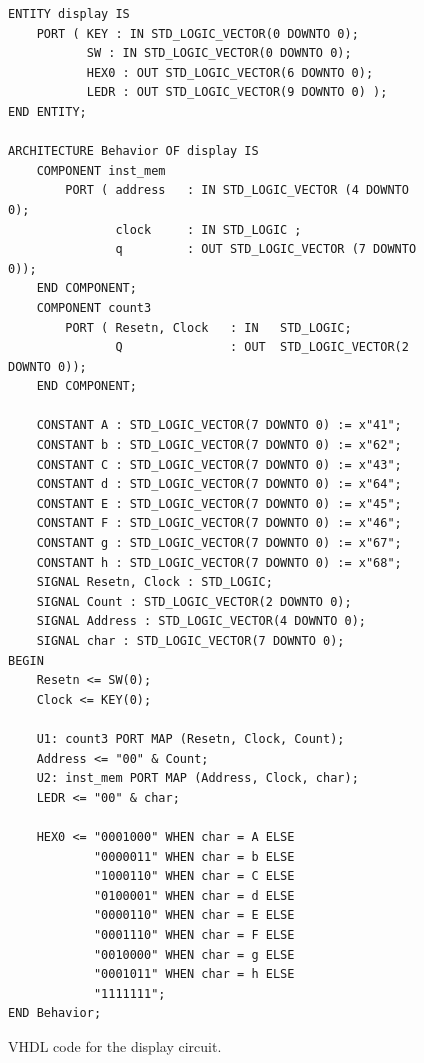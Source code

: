 \documentclass[11pt, twoside, pdftex]{article}
\begin{document}
\lstset{language=VHDL,numbers=none,escapechar=?}
\begin{figure}[h!]
\begin{center}
\begin{minipage}[t]{15 cm}
\begin{lstlisting}[name=display]
ENTITY display IS
    PORT ( KEY : IN STD_LOGIC_VECTOR(0 DOWNTO 0);
           SW : IN STD_LOGIC_VECTOR(0 DOWNTO 0);  
           HEX0 : OUT STD_LOGIC_VECTOR(6 DOWNTO 0);
           LEDR : OUT STD_LOGIC_VECTOR(9 DOWNTO 0) );
END ENTITY; 

ARCHITECTURE Behavior OF display IS
    COMPONENT inst_mem 
        PORT ( address   : IN STD_LOGIC_VECTOR (4 DOWNTO 0);
               clock     : IN STD_LOGIC ;
               q         : OUT STD_LOGIC_VECTOR (7 DOWNTO 0));
    END COMPONENT;
    COMPONENT count3
        PORT ( Resetn, Clock   : IN   STD_LOGIC;
               Q               : OUT  STD_LOGIC_VECTOR(2 DOWNTO 0));
    END COMPONENT;

    CONSTANT A : STD_LOGIC_VECTOR(7 DOWNTO 0) := x"41";
    CONSTANT b : STD_LOGIC_VECTOR(7 DOWNTO 0) := x"62";
    CONSTANT C : STD_LOGIC_VECTOR(7 DOWNTO 0) := x"43";
    CONSTANT d : STD_LOGIC_VECTOR(7 DOWNTO 0) := x"64";
    CONSTANT E : STD_LOGIC_VECTOR(7 DOWNTO 0) := x"45";
    CONSTANT F : STD_LOGIC_VECTOR(7 DOWNTO 0) := x"46";
    CONSTANT g : STD_LOGIC_VECTOR(7 DOWNTO 0) := x"67";
    CONSTANT h : STD_LOGIC_VECTOR(7 DOWNTO 0) := x"68";
    SIGNAL Resetn, Clock : STD_LOGIC;
    SIGNAL Count : STD_LOGIC_VECTOR(2 DOWNTO 0);
    SIGNAL Address : STD_LOGIC_VECTOR(4 DOWNTO 0);
    SIGNAL char : STD_LOGIC_VECTOR(7 DOWNTO 0);
BEGIN 
    Resetn <= SW(0);
    Clock <= KEY(0);

    U1: count3 PORT MAP (Resetn, Clock, Count);
    Address <= "00" & Count;
    U2: inst_mem PORT MAP (Address, Clock, char);
    LEDR <= "00" & char;
    
    HEX0 <= "0001000" WHEN char = A ELSE
            "0000011" WHEN char = b ELSE
            "1000110" WHEN char = C ELSE
            "0100001" WHEN char = d ELSE
            "0000110" WHEN char = E ELSE
            "0001110" WHEN char = F ELSE
            "0010000" WHEN char = g ELSE
            "0001011" WHEN char = h ELSE
            "1111111";
END Behavior;
\end{lstlisting}
\end{minipage}
\caption{VHDL code for the display circuit.}
\label{fig:display}
\end{center}
\end{figure}
\clearpage
\newpage
\end{document}
